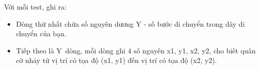 Với mỗi test, ghi ra:  
\begin{itemize}
	\item     Dòng thứ nhất chứa số nguyên dương Y - số bước di chuyển trong dãy di chuyển của bạn.   
	\item     Tiếp theo là Y dòng, mỗi dòng ghi 4 số nguyên x1, y1, x2, y2, cho biết quân cờ nhảy từ vị trí có tọa độ (x1, y1) đến vị trí có tọa độ (x2, y2).   
\end{itemize}